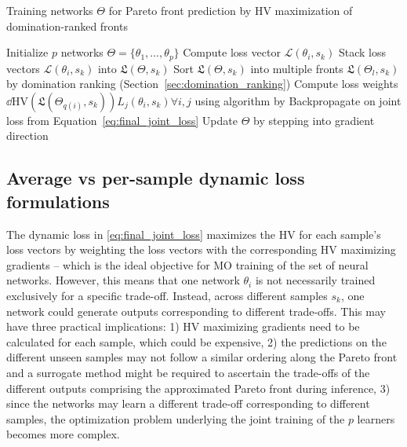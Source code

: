 \begin{algorithm}[htbp]
\caption{Training networks $\Theta$ for Pareto front prediction by HV maximization of domination-ranked fronts}
\begin{algorithmic}
\State Initialize $p$ networks $\Theta=\{\theta_{1},\dots,\theta_{p}\}$
            \State Compute loss vector $\mathcal{L}(\theta_{i},s_{k})$%
        \EndFor
    \EndFor
        \State Stack loss vectors $\mathcal{L}(\theta_{i},s_{k})$ into $\mathfrak{L}(\Theta,s_{k})$
        \State Sort $\mathfrak{L}(\Theta,s_{k})$ into multiple fronts $\mathfrak{L}(\Theta_{l},s_{k})$ by domination ranking (Section~\ref{sec:domination_ranking})
            \State Compute loss weights $\dd{\mathrm{HV}\left(\mathfrak{L}(\Theta_{q(i)},s_{k}) \right)}{L_{j}(\theta_{i},s_{k})}\forall i,j$ using algorithm by
            \State \cite{emmerich2014time} %
        \EndFor
    \EndFor
        \State Backpropagate on joint loss from Equation~\eqref{eq:final_joint_loss}
    \EndFor
    \State Update $\Theta$ by stepping into gradient direction
\EndFor
\end{algorithmic}
\label{alg:pseudocode}
\end{algorithm}

\subsection{Average vs per-sample dynamic loss formulations}
\label{sec:batch_vs_persample}
The dynamic loss in \eqref{eq:final_joint_loss} maximizes the HV for each sample's loss vectors by weighting the loss vectors with the corresponding HV maximizing gradients -- which is the ideal objective for MO training of the set of neural networks. However, this means that one network $\theta_{i}$ is not necessarily trained exclusively for a specific trade-off. Instead, across different samples $s_{k}$, one network could generate outputs corresponding to different trade-offs. This may have three practical implications: 1) HV maximizing gradients need to be calculated for each sample, which could be expensive, 2) the predictions on the different unseen samples may not follow a similar ordering along the Pareto front and a surrogate method might be required to ascertain the trade-offs of the different outputs comprising the approximated Pareto front during inference, 3) since the networks may learn a different trade-off corresponding to different samples, the optimization problem underlying the joint training of the $p$ learners becomes more complex.

